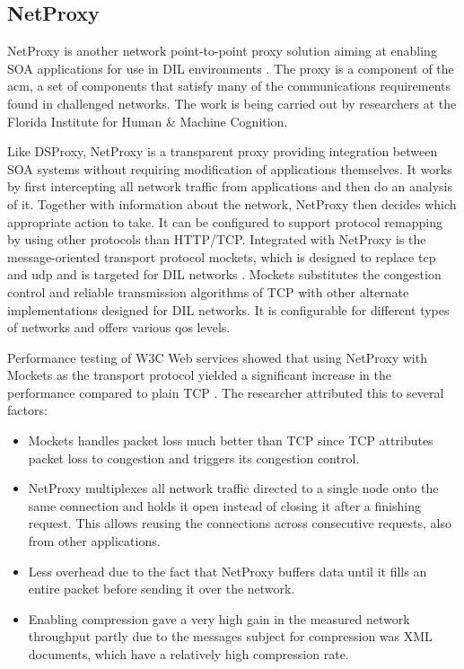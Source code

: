 \subsection{NetProxy}

NetProxy is another network point-to-point proxy solution aiming at enabling SOA
applications for use in DIL environments \cite{suri-netproxy}. The proxy is a
component of the \gls{acm}, a set of components that satisfy many of the
communications requirements found in challenged networks. The work is being
carried out by researchers at the Florida Institute for Human \& Machine
Cognition.

Like DSProxy, NetProxy is a transparent proxy providing integration between SOA
systems without requiring modification of applications themselves. It works by
first intercepting all network traffic from applications and then do an analysis
of it. Together with information about the network, NetProxy then decides which
appropriate action to take. It can be configured to support protocol remapping
by using other protocols than HTTP/TCP. Integrated with NetProxy is the
message-oriented transport protocol \gls{mockets}, which is designed to replace
\gls{tcp} and \gls{udp} and is targeted for DIL networks \cite{suri-netproxy}.
Mockets substitutes the congestion control and reliable transmission algorithms
of TCP with other alternate implementations designed for DIL networks. It is
configurable for different types of networks and offers various \gls{qos}
levels.

Performance testing of W3C Web services showed that using NetProxy with Mockets as
the transport protocol yielded a significant increase in the performance
compared to plain TCP \cite{suri-netproxy}. The researcher attributed this to
several factors:

\begin{itemize}

    \item Mockets handles packet loss much better than TCP since TCP attributes
    packet loss to congestion and triggers its congestion control.

    \item NetProxy multiplexes all network traffic directed to a single node
    onto the same connection and holds it open instead of closing it after a
    finishing request. This allows reusing the connections across consecutive
    requests, also from other applications.

    \item Less overhead due to the fact that NetProxy buffers data until it fills an
    entire packet before sending it over the network.

    \item Enabling compression gave a very high gain in the measured network
    throughput partly due to the messages subject for compression was XML
    documents, which have a relatively high compression rate.

\end{itemize}

